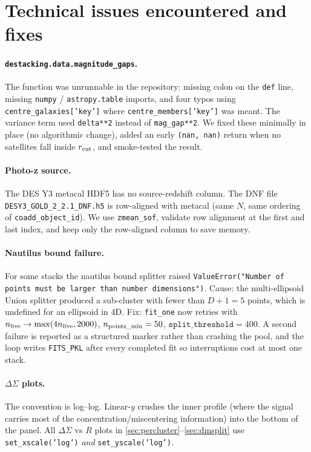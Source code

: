 \documentclass[11pt,a4paper]{article}
\newcommand{\DS}{\Delta\Sigma}
\begin{document}
\section{Technical issues encountered and fixes}

\paragraph{\texttt{destacking.data.magnitude\_gaps}.}
The function was unrunnable in the repository: missing colon on the
\texttt{def} line, missing \texttt{numpy} / \texttt{astropy.table} imports,
and four typos using \texttt{centre\_galaxies['key']} where
\texttt{centre\_members['key']} was meant. The variance term used
\texttt{delta**2} instead of \texttt{mag\_gap**2}. We fixed these minimally
in place (no algorithmic change), added an early
\texttt{(nan, nan)} return when no satellites fall inside $r_{\rm cut}$,
and smoke-tested the result.

\paragraph{Photo-z source.} The DES Y3 metacal HDF5 has no source-redshift
column. The DNF file \verb|DESY3_GOLD_2_2.1_DNF.h5| is row-aligned with
metacal (same $N$, same ordering of \verb|coadd_object_id|). We use
\verb|zmean_sof|, validate row alignment at the first and last index, and
keep only the row-aligned column to save memory.

\paragraph{Nautilus bound failure.} For some stacks the nautilus bound
splitter raised
\texttt{ValueError("Number of points must be larger than number dimensions")}.
Cause: the multi-ellipsoid Union splitter produced a sub-cluster with
fewer than $D+1=5$ points, which is undefined for an ellipsoid in 4D. Fix:
\texttt{fit\_one} now retries with $n_{\rm live} \to \max(4n_{\rm live},
2000)$, $n_{\rm points\_min}=50$, $\texttt{split\_threshold}=400$. A second
failure is reported as a structured marker rather than crashing the pool,
and the loop writes \texttt{FITS\_PKL} after every completed fit so
interruptions cost at most one stack.

\paragraph{$\DS$ plots.}
The convention is log--log. Linear-$y$ crushes the inner profile (where
the signal carries most of the concentration/miscentering information) into
the bottom of the panel. All $\DS$ vs $R$ plots in
\autoref{sec:percluster}--\ref{sec:dmsplit} use
\texttt{set\_xscale('log')} \emph{and} \texttt{set\_yscale('log')}.
\end{document}
